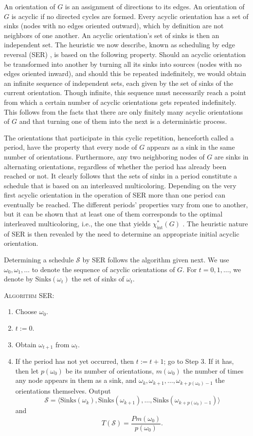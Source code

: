 \documentclass{article}
\begin{document}
An orientation of $G$ is an assignment of directions to its edges. An
orientation of $G$ is acyclic if no directed cycles are formed. Every acyclic
orientation has a set of sinks (nodes with no edges oriented outward), which by
definition are not neighbors of one another. An acyclic orientation's set of
sinks is then an independent set. The heuristic we now describe, known as
scheduling by edge reversal (SER) \cite{bg89,b96}, is based on the following
property. Should an acyclic orientation be transformed into another by turning
all its sinks into sources (nodes with no edges oriented inward), and should
this be repeated indefinitely, we would obtain an infinite sequence of
independent sets, each given by the set of sinks of the current orientation.
Though infinite, this sequence must necessarily reach a point from which a
certain number of acyclic orientations gets repeated indefinitely. This follows
from the facts that there are only finitely many acyclic orientations of $G$ and
that turning one of them into the next is a deterministic process.

The orientations that participate in this cyclic repetition, henceforth called
a period, have the property that every node of $G$ appears as a sink in the same
number of orientations. Furthermore, any two neighboring nodes of $G$ are sinks
in alternating orientations, regardless of whether the period has already been
reached or not. It clearly follows that the sets of sinks in a period constitute
a schedule that is based on an interleaved multicoloring. Depending on the very
first acyclic orientation in the operation of SER more than one period can
eventually be reached. The different periods' properties vary from one to
another, but it can be shown that at least one of them corresponds to the
optimal interleaved multicoloring, i.e., the one that yields
$\chi^*_\mathrm{int}(G)$ \cite{bg89}. The heuristic nature of SER is then
revealed by the need to determine an appropriate initial acyclic orientation.

Determining a schedule $\mathcal{S}$ by SER follows the algorithm given next. We
use $\omega_0,\omega_1,\ldots$ to denote the sequence of acyclic orientations of
$G$. For $t=0,1,\ldots$, we denote by $\mathrm{Sinks}(\omega_t)$ the set of
sinks of $\omega_t$.

\bigskip\noindent
\textsc{Algorithm} SER:
\begin{enumerate}
\item Choose $\omega_0$.
\item $t := 0$.
\item Obtain $\omega_{t+1}$ from $\omega_t$.
\item If the period has not yet occurred, then $t:=t+1$; go to Step 3. If it
has, then let $p(\omega_0)$ be its number of orientations, $m(\omega_0)$ the
number of times any node appears in them as a sink, and
$\omega_k,\omega_{k+1},\ldots,\omega_{k+p(\omega_0)-1}$ the orientations
themselves. Output
$$
\mathcal{S}=
\langle\mathrm{Sinks}(\omega_k),\mathrm{Sinks}(\omega_{k+1}),\ldots,
\mathrm{Sinks}(\omega_{k+p(\omega_0)-1})\rangle
$$
and
$$
T(\mathcal{S})=
\frac{Pm(\omega_0)}{p(\omega_0)}.
$$
\end{enumerate}
\end{document}
